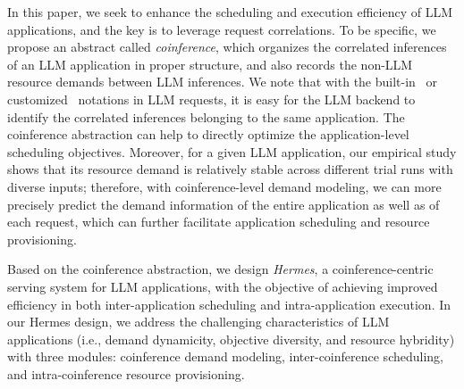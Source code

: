 In this paper, we seek to enhance the scheduling and execution efficiency of LLM applications, and the key is to leverage request correlations.
To be specific, 
we propose an abstract called \emph{coinference}, 
which organizes the correlated inferences of an LLM application in proper structure, and also records the non-LLM resource demands between LLM inferences.
We note that with the built-in~\cite{assistants_api} or customized~\cite{OpenAI_extra_body} notations in LLM requests, it is easy for the LLM backend to identify the correlated inferences belonging to the same application.
The coinference abstraction can help to directly optimize 
the application-level scheduling objectives.
Moreover, for a given LLM application, our empirical study shows that its resource demand is relatively stable across different trial runs with diverse inputs; therefore, with coinference-level demand modeling, we can more precisely predict the demand information of the entire application as well as of each request, which can further facilitate application scheduling and resource provisioning. 


Based on the coinference abstraction, we design \emph{Hermes}, a coinference-centric serving system for LLM applications, with the objective of achieving improved efficiency in both inter-application scheduling and intra-application execution.
In our Hermes design, we address the challenging characteristics of LLM applications (i.e., demand dynamicity, objective diversity, and resource hybridity) with three modules: coinference demand modeling, inter-coinference scheduling, and intra-coinference resource provisioning. 


